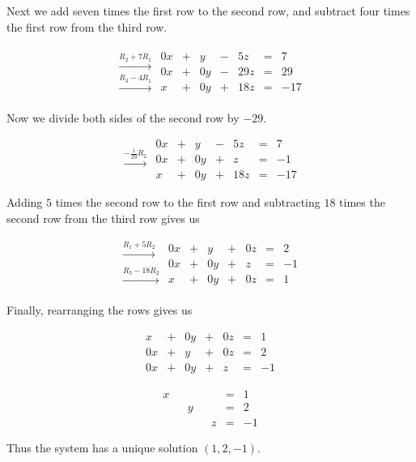 \documentclass{ximera}
\begin{document}
\begin{example}
\begin{explanation}
Next we add seven times the first row to the second row, and subtract four times the first row from the third row. 

$$\begin{array}{c}
 \\
 \xrightarrow{R_2+7R_1}\\
\xrightarrow{R_3-4R_1}\\
 \end{array}
 \begin{array}{ccccccc}
      0x & +&y&-&5z&= &7 \\
	 0x& +&0y&-&29z&=&29\\
     x& +&0y&+&18z&=&-17
    \end{array}$$
    
    Now we divide both sides of the second row by $-29$.
    
    $$
    \begin{array}{c}
    \\
 \xrightarrow{-\frac{1}{29}R_2}\\
\\
 \end{array}
 \begin{array}{ccccccc}
      0x & +&y&-&5z&= &7 \\
	 0x& +&0y&+&z&=&-1\\
     x& +&0y&+&18z&=&-17
    \end{array}$$
    
    Adding $5$ times the second row to the first row and subtracting $18$ times the second row from the third row gives us
    
    $$\begin{array}{c}
 \xrightarrow{R_1+5R_2}\\
 \\
\xrightarrow{R_3-18R_2}\\
 \end{array}
 \begin{array}{ccccccc}
      0x & +&y&+&0z&= &2 \\
	 0x& +&0y&+&z&=&-1\\
     x& +&0y&+&0z&=&1
    \end{array}$$

Finally, rearranging the rows gives us

$$\begin{array}{ccccccc}
     x& +&0y&+&0z&=&1\\
     0x & +&y&+&0z&= &2 \\
	 0x& +&0y&+&z&=&-1
     \end{array}$$
     
 $$\begin{array}{ccccccc}
     x& &&&&=&1\\
      & &y&&&= &2 \\
	 &&&&z&=&-1
     \end{array}$$    
     
Thus the system has a unique solution $(1, 2, -1)$.
\end{explanation}
    
\end{example}
\end{document}
